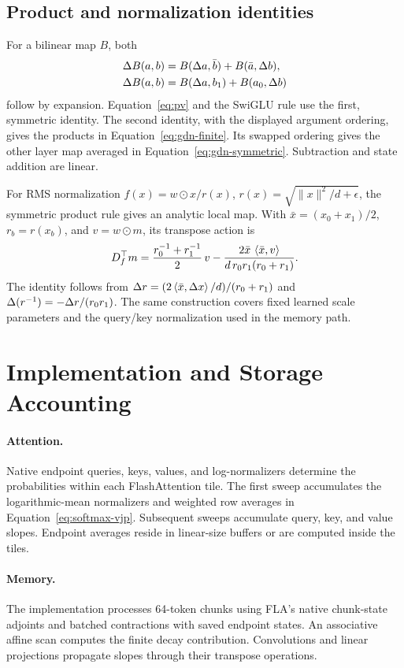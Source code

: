 \subsection{Product and normalization identities}
For a bilinear map $B$, both
\begin{align}
\Delta B(a,b)&=B(\Delta a,\bar b)+B(\bar a,\Delta b),\\
\Delta B(a,b)&=B(\Delta a,b_1)+B(a_0,\Delta b)
\end{align}
follow by expansion. Equation~\ref{eq:pv} and the SwiGLU rule use the first, symmetric identity. The second identity, with the displayed argument ordering, gives the products in Equation~\ref{eq:gdn-finite}. Its swapped ordering gives the other layer map averaged in Equation~\ref{eq:gdn-symmetric}. Subtraction and state addition are linear.

For RMS normalization $f(x)=w\odot x/r(x)$, $r(x)=\sqrt{\|x\|^2/d+\epsilon}$, the symmetric product rule gives an analytic local map. With $\bar x=(x_0+x_1)/2$, $r_b=r(x_b)$, and $v=w\odot m$, its transpose action is
\begin{equation}
D_f^\top m=
\frac{r_0^{-1}+r_1^{-1}}{2}\,v
-\frac{2\bar x\,\left\langle \bar x,v\right\rangle}{d\,r_0r_1(r_0+r_1)}.
\end{equation}
The identity follows from $\Delta r=(2\left\langle \bar x,\Delta x\right\rangle/d)/(r_0+r_1)$ and $\Delta(r^{-1})=-\Delta r/(r_0r_1)$. The same construction covers fixed learned scale parameters and the query/key normalization used in the memory path.


\section{Implementation and Storage Accounting}
\label{app:computation}

\paragraph{Attention.}
Native endpoint queries, keys, values, and log-normalizers determine the probabilities within each FlashAttention tile. The first sweep accumulates the logarithmic-mean normalizers and weighted row averages in Equation~\ref{eq:softmax-vjp}. Subsequent sweeps accumulate query, key, and value slopes. Endpoint averages reside in linear-size buffers or are computed inside the tiles.

\paragraph{Memory.}
The implementation processes 64-token chunks using FLA's native chunk-state adjoints and batched contractions with saved endpoint states. An associative affine scan computes the finite decay contribution. Convolutions and linear projections propagate slopes through their transpose operations.

